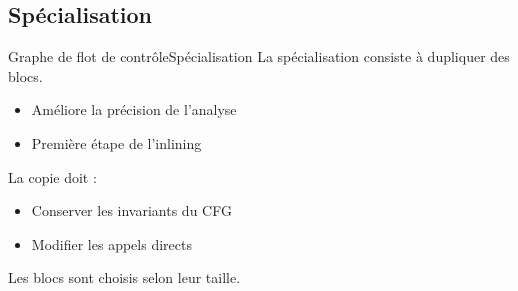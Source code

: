 \documentclass{beamer}
\begin{document}
\subsection{Spécialisation}


\begin{frame}{Graphe de flot de contrôle}{Spécialisation}
    La spécialisation consiste à dupliquer des blocs.

    \begin{itemize}
        \item Améliore la précision de l'analyse
        \item Première étape de l'inlining
    \end{itemize}

    La copie doit :

    \begin{itemize}
        \item Conserver les invariants du CFG
        \item Modifier les appels directs
    \end{itemize}

    Les blocs sont choisis selon leur taille.
\end{frame}
\end{document}
